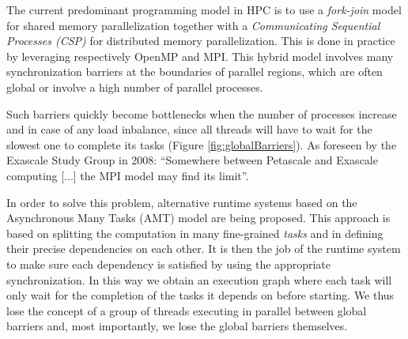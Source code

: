 The current predominant programming model in HPC is to use a \emph{fork-join} model for shared memory parallelization together with a \emph{Communicating Sequential Processes (CSP)}\cite{hoare1978communicating} for distributed memory parallelization. This is done in practice by leveraging respectively OpenMP and MPI.
This hybrid model involves many synchronization barriers at the boundaries of parallel regions, which are often global or involve a high number of parallel processes.

Such barriers quickly become bottlenecks when the number of processes increase and in case of any load inbalance, since all threads will have to wait for the slowest one to complete its tasks (Figure \ref{fig:globalBarriers}).
As foreseen by the Exascale Study Group in 2008: ``Somewhere between Petascale and Exascale computing [...] the MPI model may find its limit''.\cite{bergman2008exascale}

In order to solve this problem, alternative runtime systems based on the Asynchronous Many Tasks (AMT) model are being proposed\cite{heller2017hpx}. This approach is based on splitting the computation in many fine-grained \emph{tasks} and in defining their precise dependencies on each other.
It is then the job of the runtime system to make sure each dependency is satisfied by using the appropriate synchronization.
In this way we obtain an execution graph where each task will only wait for the completion of the tasks it depends on before starting. We thus lose the concept of 
a group of threads executing in parallel between global barriers
and, most importantly, we lose the global barriers themselves.

